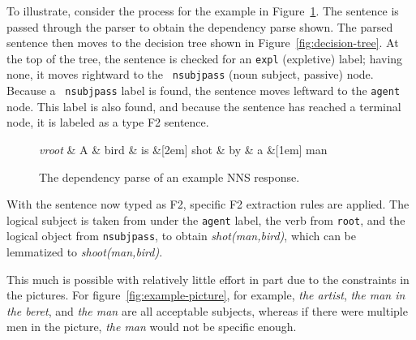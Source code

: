 To illustrate, consider the process for the example in Figure~\ref{fig:F2-dependency}.  The
sentence is passed through the parser to obtain the dependency parse shown.
The parsed sentence then moves to the
decision tree shown in Figure~\ref{fig:decision-tree}.
At the top of the tree, the sentence is checked for an {\tt expl}
(expletive) label; having none, it moves rightward to the {\tt
  nsubjpass} (noun subject, passive) node. Because a {\tt
  nsubjpass} label is found, the sentence moves leftward to the {\tt agent}
node. This label is also found, and because the sentence has reached a terminal node, it is labeled as a type F2 sentence.
%

\begin{figure}[htb!]
\begin{center}
    \begin{dependency}[arc edge,text only label,label style={above}]
    \begin{deptext}[column sep=.5em]
      \textit{vroot} \& A \& bird \& is \&[2em] shot \& by \& a \&[1em] man \\
    \end{deptext}
  \end{dependency}
\end{center}
\caption{The dependency parse of an example NNS response.}
\label{fig:F2-dependency}
\end{figure}

With the sentence now typed as F2, specific F2 extraction
rules are applied. The logical subject is taken from under the {\tt agent} label,
the verb from {\tt root}, and the logical object from {\tt nsubjpass},
to obtain \textit{shot(man,bird)}, which can be lemmatized to
\textit{shoot(man,bird)}. 

This much is possible with relatively little effort in part due to the constraints in the
pictures.  For figure~\ref{fig:example-picture}, for example,
\textit{the artist}, \textit{the man in the beret}, and \textit{the
  man} are all acceptable subjects, whereas if there were multiple men
in the picture, \textit{the man} would not be specific enough.

